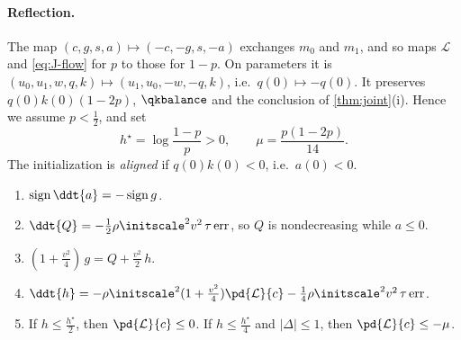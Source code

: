 \paragraph{Reflection.} The map $(c,g,s,a)\mapsto(-c,-g,s,-a)$ exchanges $m_0$ and $m_1$, and so maps $\mathcal L$ and \cref{eq:J-flow} for $p$ to those
for $1-p$. On parameters it is $(u_0,u_1,w,q,k)\mapsto(u_1,u_0,-w,-q,k)$, i.e.\ $q(0)\mapsto-q(0)$. It preserves $q(0)k(0)(1-2p)$, $\qkbalance$ and the
conclusion of \cref{thm:joint}(i). Hence we assume $p<\frac{1}{2}$, and set
\[
 h^\star=\log\frac{1-p}{p}>0,\qquad \mu=\frac{p(1-2p)}{14}.
\]
The initialization is \emph{aligned} if $q(0)k(0)<0$, i.e.\ $a(0)<0$.

\begin{lemma}
\label{lem:J-drift}
\begin{enumerate}[label=(\alph*),leftmargin=*,itemsep=2pt,topsep=3pt]
\item $\operatorname{sign}\ddt{a}=-\operatorname{sign}g$.
\item $\ddt{Q}=-\frac{1}{2}\rho\initscale^2v^2\,\tau\,\mathrm{err}$, so $Q$ is nondecreasing while $a\le0$.
\item $(1+\frac{v^2}{4})\,g=Q+\frac{v^2}{2}\,h$.
\item $\ddt{h}=-\rho\initscale^2(1+\frac{v^2}{4})\pd{\mathcal L}{c}-\frac{1}{4}\rho\initscale^2v^2\,\tau\,\mathrm{err}$.
\item If $h\le\frac{h^\star}{2}$, then $\pd{\mathcal L}{c}\le0$. If $h\le\frac{h^\star}{4}$ and $|\Delta|\le1$, then $\pd{\mathcal L}{c}\le-\mu$.
\end{enumerate}
\end{lemma}

